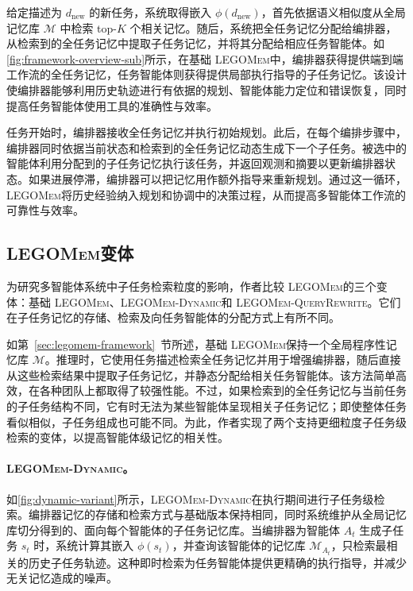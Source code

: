 \documentclass[10pt,twocolumn]{article}
\newcommand{\legomem}{\textsc{LEGOMem}}
\newcommand{\dynalegomem}{\textsc{LEGOMem-Dynamic}}
\newcommand{\queryrewritelegomem}{\textsc{LEGOMem-QueryRewrite}}
\begin{document}
给定描述为 $d_{\text{new}}$ 的新任务，系统取得嵌入 $\phi(d_{\text{new}})$，首先依据语义相似度从全局记忆库 $\mathcal{M}$ 中检索 top-$K$ 个相关记忆。随后，系统把全任务记忆分配给编排器，从检索到的全任务记忆中提取子任务记忆，并将其分配给相应任务智能体。如\autoref{fig:framework-overview-sub}所示，在基础 \legomem 中，编排器获得提供端到端工作流的全任务记忆，任务智能体则获得提供局部执行指导的子任务记忆。该设计使编排器能够利用历史轨迹进行有依据的规划、智能体能力定位和错误恢复，同时提高任务智能体使用工具的准确性与效率。

任务开始时，编排器接收全任务记忆并执行初始规划。此后，在每个编排步骤中，编排器同时依据当前状态和检索到的全任务记忆动态生成下一个子任务。被选中的智能体利用分配到的子任务记忆执行该任务，并返回观测和摘要以更新编排器状态。如果进展停滞，编排器可以把记忆用作额外指导来重新规划。通过这一循环，\legomem 将历史经验纳入规划和协调中的决策过程，从而提高多智能体工作流的可靠性与效率。

\subsection{\legomem 变体}
\label{sec:legomem-variants}

为研究多智能体系统中子任务检索粒度的影响，作者比较 \legomem 的三个变体：基础 \legomem、\dynalegomem 和 \queryrewritelegomem。它们在子任务记忆的存储、检索及向任务智能体的分配方式上有所不同。

如第~\ref{sec:legomem-framework}~节所述，基础 \legomem 保持一个全局程序性记忆库 $\mathcal{M}$。推理时，它使用任务描述检索全任务记忆并用于增强编排器，随后直接从这些检索结果中提取子任务记忆，并静态分配给相关任务智能体。该方法简单高效，在各种团队上都取得了较强性能。不过，如果检索到的全任务记忆与当前任务的子任务结构不同，它有时无法为某些智能体呈现相关子任务记忆；即使整体任务看似相似，子任务组成也可能不同。为此，作者实现了两个支持更细粒度子任务级检索的变体，以提高智能体级记忆的相关性。

\paragraph{\dynalegomem。}
如\autoref{fig:dynamic-variant}所示，\dynalegomem 在执行期间进行子任务级检索。编排器记忆的存储和检索方式与基础版本保持相同，同时系统维护从全局记忆库切分得到的、面向每个智能体的子任务记忆库。当编排器为智能体 $A_t$ 生成子任务 $s_t$ 时，系统计算其嵌入 $\phi(s_t)$，并查询该智能体的记忆库 $\mathcal{M}_{A_t}$，只检索最相关的历史子任务轨迹。这种即时检索为任务智能体提供更精确的执行指导，并减少无关记忆造成的噪声。
\end{document}
